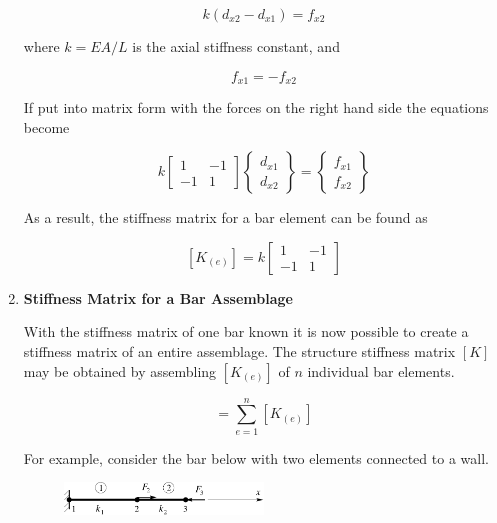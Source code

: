 \begin{enumerate}
  \begin{equation}
    k(d_{x2} - d_{x1}) = f_{x2}
  \end{equation}
  
  where $k=EA/L$ is the axial stiffness constant, and

  \begin{equation}
    f_{x1} = -f_{x2}  
  \end{equation}

  If put into matrix form with the forces on the right hand side the
  equations become

  \begin{equation}
    k\begin{bmatrix} 1   &-1   \\  -1
        &1 \end{bmatrix} \begin{Bmatrix} d_{x1} \\ d_{x2} \end{Bmatrix}
      = \begin{Bmatrix} f_{x1} \\ f_{x2} \end{Bmatrix}
  \end{equation}

  As a result, the stiffness matrix for a bar element can be found as

  \begin{equation}\label{e:singlebar}
    \left[K_{(e)}\right] = k\left[ \begin{matrix} 1   &-1   \\  -1  &1 \end{matrix} \right]
  \end{equation}

  \item {\bf Stiffness Matrix for a Bar Assemblage}

    With the stiffness matrix of one bar known it is now possible to
    create a stiffness matrix of an entire assemblage. The structure
    stiffness matrix $[K]$ may be obtained by assembling
    $\left[K_{(e)}\right]$ of $n$ individual bar elements.

    \begin{equation}
      [K] = \sum\limits_{e=1}^n \left[K_{(e)}\right]
    \end{equation}

    For example, consider the bar below with two elements connected to
    a wall. 

    \begin{figure}[H]
      \begin{center}
        \includegraphics[height=0.1\textwidth,width=0.5\textwidth]{Graphics/L06_F2.pdf}
      \end{center}
    \end{figure}


\end{enumerate}
